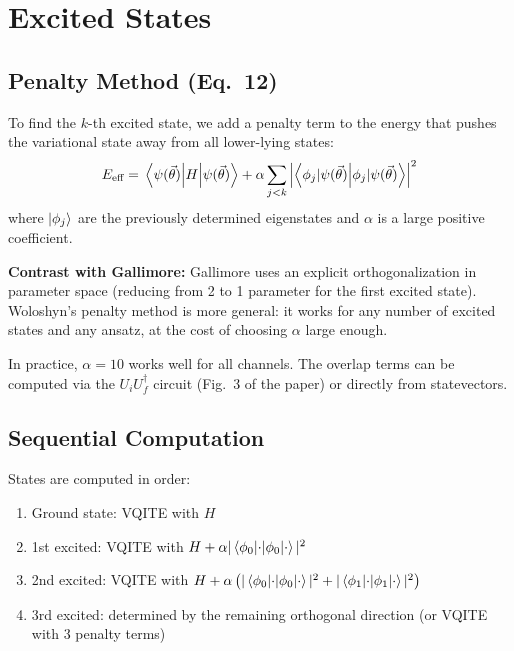 \documentclass[11pt,a4paper]{article}
\begin{document}
\section{Excited States}
\label{sec:excited}

\subsection{Penalty Method (Eq.~12)}

To find the $k$-th excited state, we add a penalty term to the energy that pushes the variational state away from all lower-lying states:
\begin{equation}
  E_{\text{eff}} = \mel{\psi(\vec{\theta})}{H}{\psi(\vec{\theta})} + \alpha \sum_{j < k} \left|\braket{\phi_j | \psi(\vec{\theta})}\right|^2
  \label{eq:penalty}
\end{equation}
where $\ket{\phi_j}$ are the previously determined eigenstates and $\alpha$ is a large positive coefficient.

\textbf{Contrast with Gallimore:} Gallimore uses an explicit orthogonalization in parameter space (reducing from 2 to 1 parameter for the first excited state). Woloshyn's penalty method is more general: it works for any number of excited states and any ansatz, at the cost of choosing $\alpha$ large enough.

In practice, $\alpha = 10$ works well for all channels. The overlap terms can be computed via the $U_i U_f^\dagger$ circuit (Fig.~3 of the paper) or directly from statevectors.

\subsection{Sequential Computation}

States are computed in order:
\begin{enumerate}[nosep]
  \item Ground state: VQITE with $H$
  \item 1st excited: VQITE with $H + \alpha|\braket{\phi_0|\cdot}|^2$
  \item 2nd excited: VQITE with $H + \alpha\left(|\braket{\phi_0|\cdot}|^2 + |\braket{\phi_1|\cdot}|^2\right)$
  \item 3rd excited: determined by the remaining orthogonal direction (or VQITE with 3 penalty terms)
\end{enumerate}
\end{document}
